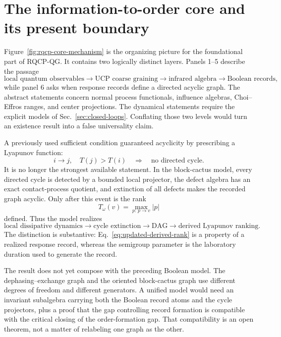 \section{The information-to-order core and its present boundary}
\label{sec:updated-core-boundary}

Figure~\ref{fig:rqcp-core-mechanism} is the organizing picture for the
foundational part of RQCP-QG.  It contains two logically distinct layers.
Panels 1--5 describe the passage
\begin{equation}
 \text{local quantum observables}
 \longrightarrow
 \text{UCP coarse graining}
 \longrightarrow
 \text{infrared algebra}
 \longrightarrow
 \text{Boolean records},
 \label{eq:updated-information-core}
\end{equation}
while panel 6 asks when response records define a directed acyclic graph.
The abstract statements concern normal process functionals, influence
algebras, Choi--Effros ranges, and center projections.  The dynamical
statements require the explicit models of
Sec.~\ref{sec:closed-loops}.  Conflating those two levels would turn an
existence result into a false universality claim.

A previously used sufficient condition guaranteed acyclicity by prescribing
a Lyapunov function:
\begin{equation}
 i\to j,\quad T(j)>T(i)
 \quad\Longrightarrow\quad
 \text{no directed cycle}.
 \label{eq:updated-lyapunov-sufficient}
\end{equation}
It is no longer the strongest available statement.  In the block-cactus
model, every directed cycle is detected by a bounded local projector, the
defect algebra has an exact contact-process quotient, and extinction of all
defects makes the recorded graph acyclic.  Only after this event is the rank
\begin{equation}
 T_\omega(v)=\max_{p:\,p\to v}|p|
 \label{eq:updated-derived-rank}
\end{equation}
defined.  Thus the model realizes
\[
 \text{local dissipative dynamics}
 \longrightarrow
 \text{cycle extinction}
 \longrightarrow
 \text{DAG}
 \longrightarrow
 \text{derived Lyapunov ranking}.
\]
The distinction is substantive: Eq.~\eqref{eq:updated-derived-rank} is a
property of a realized response record, whereas the semigroup parameter is
the laboratory duration used to generate the record.

The result does not yet compose with the preceding Boolean model.  The
dephasing--exchange graph and the oriented block-cactus graph use different
degrees of freedom and different generators.  A unified model would need an
invariant subalgebra carrying both the Boolean record atoms and the cycle
projectors, plus a proof that the gap controlling record formation is
compatible with the critical closing of the order-formation gap.  That
compatibility is an open theorem, not a matter of relabeling one graph as the
other.

